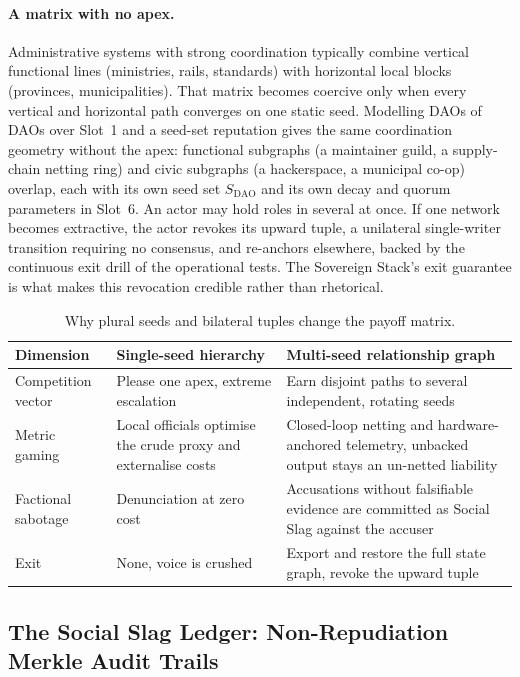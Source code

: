 \documentclass[a4paper,11pt,twoside,parskip=half-,headings=small]{scrartcl}
\begin{document}
\paragraph{A matrix with no apex.}
Administrative systems with strong coordination typically combine vertical functional lines (ministries, rails,
standards) with horizontal local blocks (provinces, municipalities). That matrix becomes coercive only when every
vertical and horizontal path converges on one static seed. Modelling DAOs of DAOs over Slot~1 and a seed-set
reputation gives the same coordination geometry without the apex: functional subgraphs (a maintainer guild, a supply-chain netting
ring) and civic subgraphs (a hackerspace, a municipal co-op) overlap, each with its own seed set $S_{\text{DAO}}$ and its own
decay and quorum parameters in Slot~6. An actor may hold roles in several at once. If one network becomes extractive, the actor
revokes its upward tuple, a unilateral single-writer transition requiring no consensus, and re-anchors elsewhere,
backed by the continuous exit drill of the operational tests. The Sovereign Stack's exit guarantee is what makes this
revocation credible rather than rhetorical.

\begin{table}[H]
\centering\small
\begin{tabularx}{\textwidth}{@{}L{3.2cm}YY@{}}
\toprule
\textbf{Dimension} & \textbf{Single-seed hierarchy} & \textbf{Multi-seed relationship graph} \\
\midrule
Competition vector & Please one apex, extreme escalation & Earn disjoint paths to several independent, rotating seeds \\
Metric gaming & Local officials optimise the crude proxy and externalise costs & Closed-loop netting and hardware-anchored telemetry, unbacked output stays an un-netted liability \\
Factional sabotage & Denunciation at zero cost & Accusations without falsifiable evidence are committed as Social Slag against the accuser \\
Exit & None, voice is crushed & Export and restore the full state graph, revoke the upward tuple \\
\bottomrule
\end{tabularx}
\caption{Why plural seeds and bilateral tuples change the payoff matrix.}
\end{table}

\subsection{The Social Slag Ledger: Non-Repudiation Merkle Audit Trails}
\label{sec:social_slag}
\end{document}
